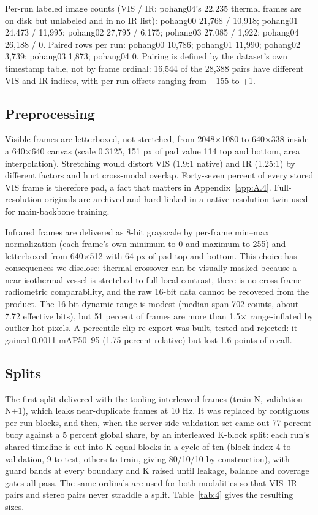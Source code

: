 \documentclass[10pt]{article}
\begin{document}
Per-run labeled image counts (VIS / IR; pohang04's 22,235 thermal frames are on disk but unlabeled and in no IR list): pohang00 21,768 / 10,918; pohang01 24,473 / 11,995; pohang02 27,795 / 6,175; pohang03 27,085 / 1,922; pohang04 26,188 / 0. Paired rows per run: pohang00 10,786; pohang01 11,990; pohang02 3,739; pohang03 1,873; pohang04 0. Pairing is defined by the dataset's own timestamp table, not by frame ordinal: 16,544 of the 28,388 pairs have different VIS and IR indices, with per-run offsets ranging from $-$155 to +1.

\subsection{Preprocessing}\label{app:A.2}
Visible frames are letterboxed, not stretched, from 2048$\times$1080 to 640$\times$338 inside a 640$\times$640 canvas (scale 0.3125, 151 px of pad value 114 top and bottom, area interpolation). Stretching would distort VIS (1.9:1 native) and IR (1.25:1) by different factors and hurt cross-modal overlap. Forty-seven percent of every stored VIS frame is therefore pad, a fact that matters in Appendix~\ref{app:A.4}. Full-resolution originals are archived and hard-linked in a native-resolution twin used for main-backbone training.

Infrared frames are delivered as 8-bit grayscale by per-frame min--max normalization (each frame's own minimum to 0 and maximum to 255) and letterboxed from 640$\times$512 with 64 px of pad top and bottom. This choice has consequences we disclose: thermal crossover can be visually masked because a near-isothermal vessel is stretched to full local contrast, there is no cross-frame radiometric comparability, and the raw 16-bit data cannot be recovered from the product. The 16-bit dynamic range is modest (median span 702 counts, about 7.72 effective bits), but 51 percent of frames are more than 1.5$\times$ range-inflated by outlier hot pixels. A percentile-clip re-export was built, tested and rejected: it gained 0.0011 mAP50--95 (1.75 percent relative) but lost 1.6 points of recall.

\subsection{Splits}\label{app:A.3}
The first split delivered with the tooling interleaved frames (train N, validation N+1), which leaks near-duplicate frames at 10 Hz. It was replaced by contiguous per-run blocks, and then, when the server-side validation set came out 77 percent buoy against a 5 percent global share, by an interleaved K-block split: each run's shared timeline is cut into K equal blocks in a cycle of ten (block index 4 to validation, 9 to test, others to train, giving 80/10/10 by construction), with guard bands at every boundary and K raised until leakage, balance and coverage gates all pass. The same ordinals are used for both modalities so that VIS--IR pairs and stereo pairs never straddle a split. Table~\ref{tab:4} gives the resulting sizes.
\end{document}
